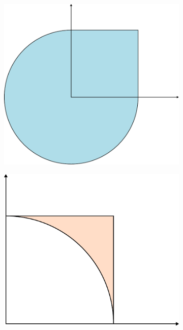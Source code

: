 \documentclass[11pt,a4paper]{article}
\begin{document}
\begin{itemize}
\begin{itemize}
\begin{figure}[!htb]
\begin{subfigure}[b]{0.24\textwidth}
                \caption{}\label{fig:intersection}
            \end{subfigure}
            \begin{subfigure}[b]{0.24\textwidth}
                \includegraphics[width=\textwidth]{figures/SUD.pdf}
                \caption{}\label{fig:union}
            \end{subfigure}
            \begin{subfigure}[b]{0.24\textwidth}
                \includegraphics[width=\textwidth]{figures/difference.pdf}
                \caption{}\label{fig:difference}
            \end{subfigure}
        \end{figure}
    \end{itemize}


\end{itemize}
\end{document}
